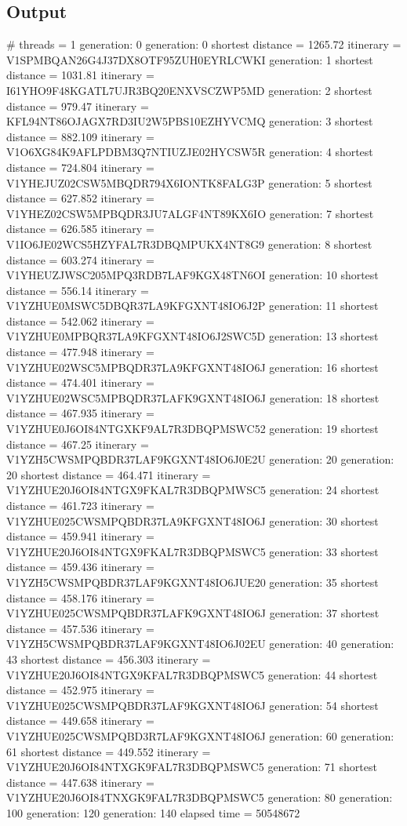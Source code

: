 \documentclass[11pt, letterpaper]{article}
\begin{document}
	\subsection{Output}
	\begin{small}
		\noindent \# threads = 1 \newline
		generation: 0 \newline
		generation: 0 shortest distance = 1265.72	 itinerary = V1SPMBQAN26G4J37DX8OTF95ZUH0EYRLCWKI
		generation: 1 shortest distance = 1031.81	 itinerary = I61YHO9F48KGATL7UJR3BQ20ENXVSCZWP5MD
		generation: 2 shortest distance = 979.47	 itinerary = KFL94NT86OJAGX7RD3IU2W5PBS10EZHYVCMQ
		generation: 3 shortest distance = 882.109	 itinerary = V1O6XG84K9AFLPDBM3Q7NTIUZJE02HYCSW5R
		generation: 4 shortest distance = 724.804	 itinerary = V1YHEJUZ02CSW5MBQDR794X6IONTK8FALG3P
		generation: 5 shortest distance = 627.852	 itinerary = V1YHEZ02CSW5MPBQDR3JU7ALGF4NT89KX6IO
		generation: 7 shortest distance = 626.585	 itinerary = V1IO6JE02WCS5HZYFAL7R3DBQMPUKX4NT8G9
		generation: 8 shortest distance = 603.274	 itinerary = V1YHEUZJWSC205MPQ3RDB7LAF9KGX48TN6OI
		generation: 10 shortest distance = 556.14	 itinerary = V1YZHUE0MSWC5DBQR37LA9KFGXNT48IO6J2P
		generation: 11 shortest distance = 542.062	 itinerary = V1YZHUE0MPBQR37LA9KFGXNT48IO6J2SWC5D
		generation: 13 shortest distance = 477.948	 itinerary = V1YZHUE02WSC5MPBQDR37LA9KFGXNT48IO6J
		generation: 16 shortest distance = 474.401	 itinerary = V1YZHUE02WSC5MPBQDR37LAFK9GXNT48IO6J
		generation: 18 shortest distance = 467.935	 itinerary = V1YZHUE0J6OI84NTGXKF9AL7R3DBQPMSWC52
		generation: 19 shortest distance = 467.25	 itinerary = V1YZH5CWSMPQBDR37LAF9KGXNT48IO6J0E2U
		generation: 20\newline
		generation: 20 shortest distance = 464.471	 itinerary = V1YZHUE20J6OI84NTGX9FKAL7R3DBQPMWSC5
		generation: 24 shortest distance = 461.723	 itinerary = V1YZHUE025CWSMPQBDR37LA9KFGXNT48IO6J
		generation: 30 shortest distance = 459.941	 itinerary = V1YZHUE20J6OI84NTGX9FKAL7R3DBQPMSWC5
		generation: 33 shortest distance = 459.436	 itinerary = V1YZH5CWSMPQBDR37LAF9KGXNT48IO6JUE20
		generation: 35 shortest distance = 458.176	 itinerary = V1YZHUE025CWSMPQBDR37LAFK9GXNT48IO6J
		generation: 37 shortest distance = 457.536	 itinerary = V1YZH5CWSMPQBDR37LAF9KGXNT48IO6J02EU
		generation: 40\newline
		generation: 43 shortest distance = 456.303	 itinerary = V1YZHUE20J6OI84NTGX9KFAL7R3DBQPMSWC5
		generation: 44 shortest distance = 452.975	 itinerary = V1YZHUE025CWSMPQBDR37LAF9KGXNT48IO6J
		generation: 54 shortest distance = 449.658	 itinerary = V1YZHUE025CWSMPQBD3R7LAF9KGXNT48IO6J
		generation: 60\newline
		generation: 61 shortest distance = 449.552	 itinerary = V1YZHUE20J6OI84NTXGK9FAL7R3DBQPMSWC5
		generation: 71 shortest distance = 447.638	 itinerary = V1YZHUE20J6OI84TNXGK9FAL7R3DBQPMSWC5
		generation: 80\newline
		generation: 100\newline
		generation: 120\newline
		generation: 140\newline
		elapsed time = 50548672
		

\end{small}
\end{document}
